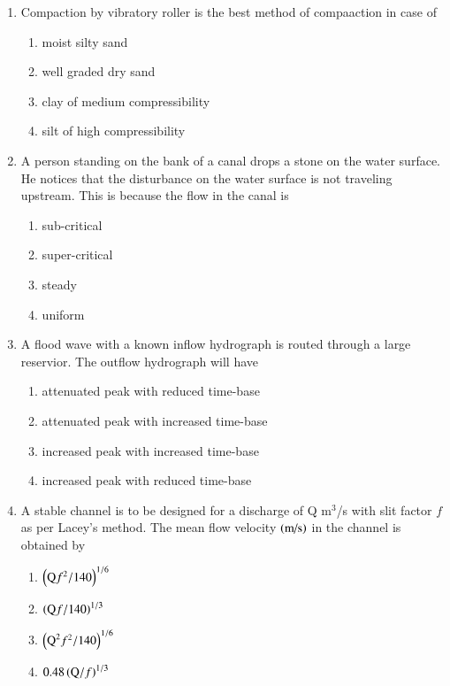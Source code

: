 \documentclass[journal,12pt,onecolumn]{IEEEtran}
\theoremstyle{remark}
\begin{document}
\begin{enumerate}
\item Compaction by vibratory roller is the best method of compaaction in case of

\begin{enumerate}
	\item moist silty sand
	\item well graded dry sand
	\item clay of medium compressibility
	\item silt of high compressibility
\end{enumerate}

\item A person standing on the bank of a canal drops a stone on the water surface. He notices that the disturbance on the water surface is not traveling upstream. This is because the flow in the canal is

\begin{enumerate}
	\item sub-critical
	\item super-critical
	\item steady
	\item uniform
\end{enumerate}

\item A flood wave with a known inflow hydrograph is routed through a large reservior. The outflow hydrograph will have

\begin{enumerate}
	\item attenuated peak with reduced time-base
	\item attenuated peak with increased time-base
	\item increased peak with increased time-base
	\item increased peak with reduced time-base
\end{enumerate}

\item A stable channel is to be designed for a discharge of Q m$^3$/s with slit factor $f$ as per Lacey's method. The mean flow velocity $\left(\text{m/s}\right)$ in the channel is obtained by

\begin{enumerate}
	\item $\left(\text{Q}f^2/140\right)^{1/6}$
	\item $\left(\text{Q}f/140\right)^{1/3}$
	\item $\left(\text{Q}^2f^2/140\right)^{1/6}$
	\item $0.48\left(\text{Q}/f\right)^{1/3}$
\end{enumerate}


\end{enumerate}
\end{document}
